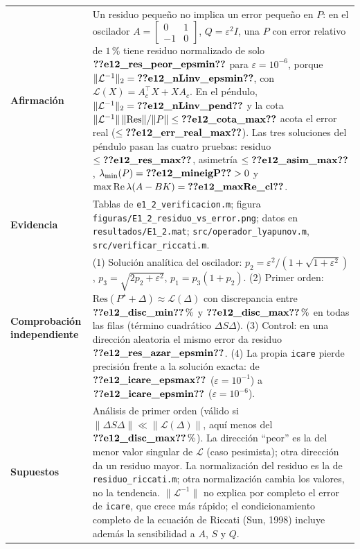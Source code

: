 \begin{recuadro}[title=Ficha de evidencia — E1.2: verificación de las soluciones y condicionamiento]
\begin{tabularx}{\linewidth}{@{}>{\bfseries}p{3.1cm} >{\raggedright\arraybackslash}X@{}}
Afirmación &
Un residuo pequeño no implica un error pequeño en $P$: en el oscilador
$A=\left[\begin{smallmatrix}0&1\\-1&0\end{smallmatrix}\right]$, $Q=\varepsilon^2 I$, una $P$ con error relativo
de $1\,\%$ tiene residuo normalizado de solo $\V{e12_res_peor_epsmin}$ para $\varepsilon=10^{-6}$, porque
$\|\mathcal{L}^{-1}\|_2=\V{e12_nLinv_epsmin}$, con $\mathcal{L}(X)=A_c^\top X+XA_c$. En el péndulo,
$\|\mathcal{L}^{-1}\|_2=\V{e12_nLinv_pend}$ y la cota $\|\mathcal{L}^{-1}\|\,\|\mathrm{Res}\|/\|P\|\le \V{e12_cota_max}$
acota el error real ($\le \V{e12_err_real_max}$). Las tres soluciones del péndulo pasan las cuatro
pruebas: residuo $\le\V{e12_res_max}$, asimetría $\le\V{e12_asim_max}$,
$\lambda_{\min}(P)=\V{e12_mineigP}>0$ y $\max\operatorname{Re}\lambda(A-BK)=\V{e12_maxRe_cl}$. \\[3pt]
Evidencia &
Tablas de \texttt{e1\_2\_verificacion.m}; figura \texttt{figuras/E1\_2\_residuo\_vs\_error.png};
datos en \texttt{resultados/E1\_2.mat}; \texttt{src/operador\_lyapunov.m}, \texttt{src/verificar\_riccati.m}. \\[3pt]
Comprobación independiente &
(1) Solución analítica del oscilador: $p_2=\varepsilon^2/(1+\sqrt{1+\varepsilon^2})$,
$p_3=\sqrt{2p_2+\varepsilon^2}$, $p_1=p_3(1+p_2)$.
(2) Primer orden: $\mathrm{Res}(P^\star+\Delta)\approx\mathcal{L}(\Delta)$ con discrepancia entre
$\V{e12_disc_min}\,\%$ y $\V{e12_disc_max}\,\%$ en todas las filas (término cuadrático $\Delta S\Delta$).
(3) Control: en una dirección aleatoria el mismo error da residuo $\V{e12_res_azar_epsmin}$.
(4) La propia \texttt{icare} pierde precisión frente a la solución exacta: de $\V{e12_icare_epsmax}$
($\varepsilon=10^{-1}$) a $\V{e12_icare_epsmin}$ ($\varepsilon=10^{-6}$). \\[3pt]
Supuestos &
Análisis de primer orden (válido si $\|\Delta S\Delta\|\ll\|\mathcal{L}(\Delta)\|$, aquí menos del $\V{e12_disc_max}\,\%$).
La dirección ``peor'' es la del menor valor singular de $\mathcal{L}$ (caso pesimista); otra dirección
da un residuo mayor. La normalización del residuo es la de \texttt{residuo\_riccati.m}; otra
normalización cambia los valores, no la tendencia. $\|\mathcal{L}^{-1}\|$ no explica por completo el
error de \texttt{icare}, que crece más rápido; el condicionamiento completo de la ecuación de Riccati
(Sun, 1998) incluye además la sensibilidad a $A$, $S$ y $Q$.
\end{tabularx}
\end{recuadro}

